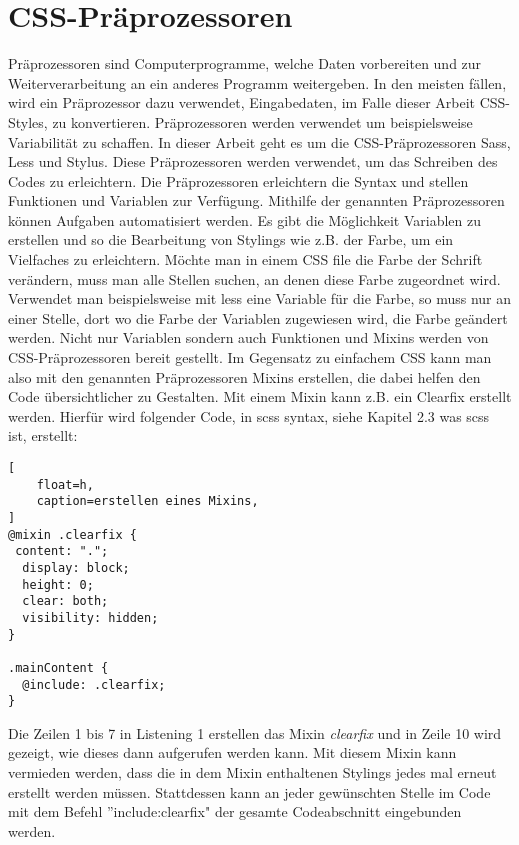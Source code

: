 \section{CSS-Präprozessoren}
Präprozessoren sind Computerprogramme, welche Daten vorbereiten und zur Weiterverarbeitung an ein anderes Programm weitergeben. In den meisten fällen, wird ein Präprozessor dazu verwendet, Eingabedaten, im Falle dieser Arbeit CSS-Styles, zu konvertieren.\autocite[]{Peter.2012}\newline
Präprozessoren werden verwendet um beispielsweise Variabilität zu schaffen.
In dieser Arbeit geht es um die CSS-Präprozessoren Sass, Less und Stylus. Diese Präprozessoren werden verwendet, um das Schreiben des Codes zu erleichtern. Die Präprozessoren erleichtern die Syntax und stellen Funktionen und Variablen zur Verfügung. \newline
Mithilfe der genannten Präprozessoren können Aufgaben automatisiert werden. Es gibt die Möglichkeit Variablen zu erstellen und so die Bearbeitung von Stylings wie z.B. der Farbe, um ein Vielfaches zu erleichtern. Möchte man in einem CSS file die Farbe der Schrift verändern, muss man alle Stellen suchen, an denen diese Farbe zugeordnet wird. Verwendet man beispielsweise mit less eine Variable für die Farbe, so muss nur an einer Stelle, dort wo die Farbe der Variablen zugewiesen wird, die Farbe geändert werden.\newline
Nicht nur Variablen sondern auch Funktionen und Mixins werden von CSS-Präprozessoren bereit gestellt. Im Gegensatz zu einfachem CSS kann man also mit den genannten Präprozessoren Mixins erstellen, die dabei helfen den Code übersichtlicher zu Gestalten. Mit einem Mixin kann z.B. ein Clearfix erstellt werden. Hierfür wird folgender Code, in scss syntax, siehe Kapitel 2.3 was scss ist, erstellt:
\begin{lstlisting}[
	float=h,
	caption=erstellen eines Mixins,
]
@mixin .clearfix {
 content: ".";
  display: block;
  height: 0;
  clear: both;
  visibility: hidden;
}

.mainContent {
  @include: .clearfix;
}
\end{lstlisting}
\newline
Die Zeilen 1 bis 7 in Listening 1 erstellen das Mixin \textit{clearfix} und in Zeile 10 wird gezeigt, wie dieses dann aufgerufen werden kann. Mit diesem Mixin kann vermieden werden, dass die in dem Mixin enthaltenen Stylings jedes mal erneut erstellt werden müssen. Stattdessen kann an jeder gewünschten Stelle im Code mit dem Befehl ''include:clearfix" der gesamte Codeabschnitt eingebunden werden.

